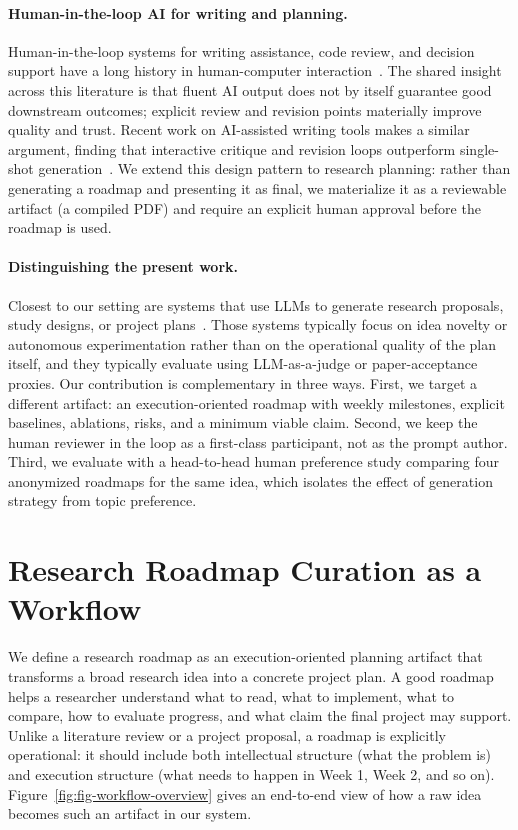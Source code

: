 \documentclass[11pt]{article}
\begin{document}
\paragraph{Human-in-the-loop AI for writing and planning.}
Human-in-the-loop systems for writing assistance, code review, and decision support have a long history in human-computer interaction~\cite{amershi2014humanloop, bansal2021accuracy, lee2022coauthor}. The shared insight across this literature is that fluent AI output does not by itself guarantee good downstream outcomes; explicit review and revision points materially improve quality and trust. Recent work on AI-assisted writing tools makes a similar argument, finding that interactive critique and revision loops outperform single-shot generation~\cite{lee2022coauthor, dhillon2024shapingai}. We extend this design pattern to research planning: rather than generating a roadmap and presenting it as final, we materialize it as a reviewable artifact (a compiled PDF) and require an explicit human approval before the roadmap is used.

\paragraph{Distinguishing the present work.}
Closest to our setting are systems that use LLMs to generate research proposals, study designs, or project plans~\cite{baek2024researchagent, si2024llmideas, lu2024aiscientist}. Those systems typically focus on idea novelty or autonomous experimentation rather than on the operational quality of the plan itself, and they typically evaluate using LLM-as-a-judge or paper-acceptance proxies. Our contribution is complementary in three ways. First, we target a different artifact: an execution-oriented roadmap with weekly milestones, explicit baselines, ablations, risks, and a minimum viable claim. Second, we keep the human reviewer in the loop as a first-class participant, not as the prompt author. Third, we evaluate with a head-to-head human preference study comparing four anonymized roadmaps for the same idea, which isolates the effect of generation strategy from topic preference.


\section{Research Roadmap Curation as a Workflow}
\label{sec:roadmap}
\label{sec:method}

We define a research roadmap as an execution-oriented planning artifact that transforms a broad research idea into a concrete project plan. A good roadmap helps a researcher understand what to read, what to implement, what to compare, how to evaluate progress, and what claim the final project may support. Unlike a literature review or a project proposal, a roadmap is explicitly operational: it should include both intellectual structure (what the problem is) and execution structure (what needs to happen in Week 1, Week 2, and so on). Figure~\ref{fig:fig-workflow-overview} gives an end-to-end view of how a raw idea becomes such an artifact in our system.
\end{document}
